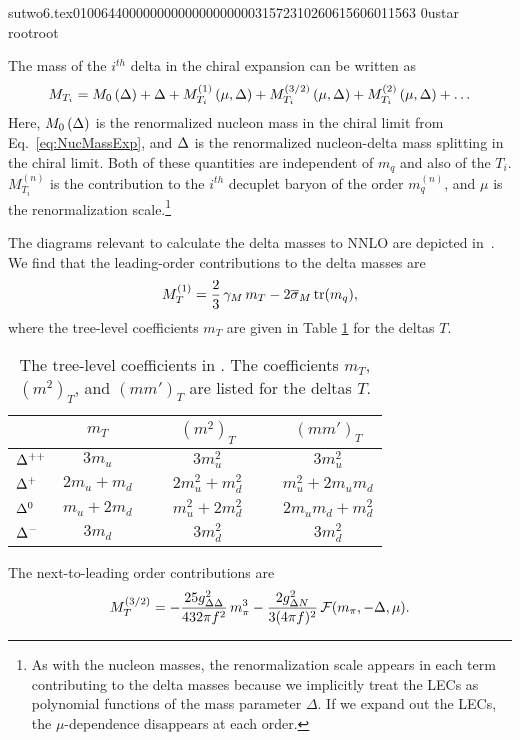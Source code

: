                                                                                                                                                                                                                                                                                       sutwo6.tex                                                                                          0100644 0000000 0000000 00000315723 10260615606 011563  0                                                                                                    ustar   root                            root                                                                                                                                                                                                                   \documentclass[prd,amssymb,amsmath,showpacs,nofootinbib,superscriptaddress]{revtex4}
\begin{document}
The mass of the $i^{th}$ delta in the chiral expansion can be written as
\begin{eqnarray}
     M_{T_i} = M_0 \left({\Delta} \right) + {\Delta} +  M_{T_i}^{(1)}\left(\mu, {\Delta} \right)
                + M_{T_i}^{(3/2)}\left(\mu, {\Delta} \right)
                + M_{T_i}^{(2)}\left(\mu, {\Delta} \right) + \ldots
\label{eq:Tmassexp}
\end{eqnarray}
Here, $M_0 \left({\Delta} \right)$ is the renormalized nucleon mass 
in the chiral limit from Eq.~\eqref{eq:NucMassExp}, and ${\Delta}$ is the renormalized nucleon-delta mass splitting in the chiral limit. 
Both of these quantities are independent of $m_q$ and also of the $T_i$.
$M_{T_i}^{(n)}$ is the contribution to the 
$i^{th}$ decuplet baryon of the order $m_q^{(n)}$, and $\mu$ is the
renormalization scale.\footnote{%
As with the nucleon masses, the renormalization scale appears in each term 
contributing to the delta masses because we implicitly
treat the LECs as polynomial functions of the mass parameter $\Delta$. 
If we expand out the LECs, the $\mu$-dependence disappears at each order.}%


The diagrams relevant to calculate the delta masses
to NNLO are depicted in~\cite{Tiburzi:2004rh}. 
We find that the leading-order contributions to the delta masses are
\begin{equation}
M^{(1)}_T = \frac{2}{3} \, \gamma_M \, m_T  - 2 {\overline{\sigma}}_M \, \text{tr} (m_q),
\label{eq:MLO}
\end{equation}
where the tree-level coefficients $m_T$ are given in Table \ref{t:mT} for the deltas $T$. 
\begin{table}
\caption{The tree-level coefficients in \CPT. The coefficients $m_T$,
  $(m^2)_T$, and $(mm')_T$ are listed for the deltas $T$.}
\begin{tabular}{l | c c c }
 & $m_T$ & $ \phantom{spac} (m^2)_T \phantom{spac}$ & $(mm')_T$ \\
\hline
${\Delta}^{++}$       
             &  $3 m_u$ & $3 m_u^2$  & $3m_u^2$  \\
${\Delta}^+$ 
             &  $2 m_u + m_d$ & $2 m_u^2 + m_d^2$  & $m_u^2 + 2 m_u m_d$  \\
${\Delta}^0$    
             &  $m_u + 2 m_d$ & $m_u^2 + 2 m_d^2$  & $2 m_u m_d + m_d^2$  \\
${\Delta}^-$ 
             &  $3 m_d$ & $3 m_d^2$  & $3 m_d^2$  \\
\end{tabular}
\label{t:mT}
\end{table}
%
%
%
The next-to-leading order contributions are
\begin{equation}
M^{(3/2)}_T = -\frac{25 g_{{\Delta}{\Delta}}^2}{432 \pi f^2} \, m_\pi^3 
- \frac{2 g_{{\Delta} N}^2}{3(4 \pi f)^2} \, {\mathcal F} (m_\pi,-{\Delta},\mu)
.\label{eq:MNLO}
\end{equation}
\end{document}
